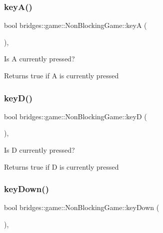 \subsubsection{\texorpdfstring{key\+A()}{keyA()}}
{\footnotesize\ttfamily bool bridges\+::game\+::\+Non\+Blocking\+Game\+::keyA (\begin{DoxyParamCaption}{ }\end{DoxyParamCaption})\hspace{0.3cm}{\ttfamily [inline]}, {\ttfamily [protected]}}



Is A currently pressed? 

\begin{DoxyReturn}{Returns}
true if A is currently pressed 
\end{DoxyReturn}
\mbox{\label{classbridges_1_1game_1_1_non_blocking_game_a932979445cc8acea618092b83b4a9756}} 
\subsubsection{\texorpdfstring{key\+D()}{keyD()}}
{\footnotesize\ttfamily bool bridges\+::game\+::\+Non\+Blocking\+Game\+::keyD (\begin{DoxyParamCaption}{ }\end{DoxyParamCaption})\hspace{0.3cm}{\ttfamily [inline]}, {\ttfamily [protected]}}



Is D currently pressed? 

\begin{DoxyReturn}{Returns}
true if D is currently pressed 
\end{DoxyReturn}
\mbox{\label{classbridges_1_1game_1_1_non_blocking_game_a52dd79aaaee9da77fa392fb8ec37fa94}} 
\subsubsection{\texorpdfstring{key\+Down()}{keyDown()}}
{\footnotesize\ttfamily bool bridges\+::game\+::\+Non\+Blocking\+Game\+::key\+Down (\begin{DoxyParamCaption}{ }\end{DoxyParamCaption})\hspace{0.3cm}{\ttfamily [inline]}, {\ttfamily [protected]}}



